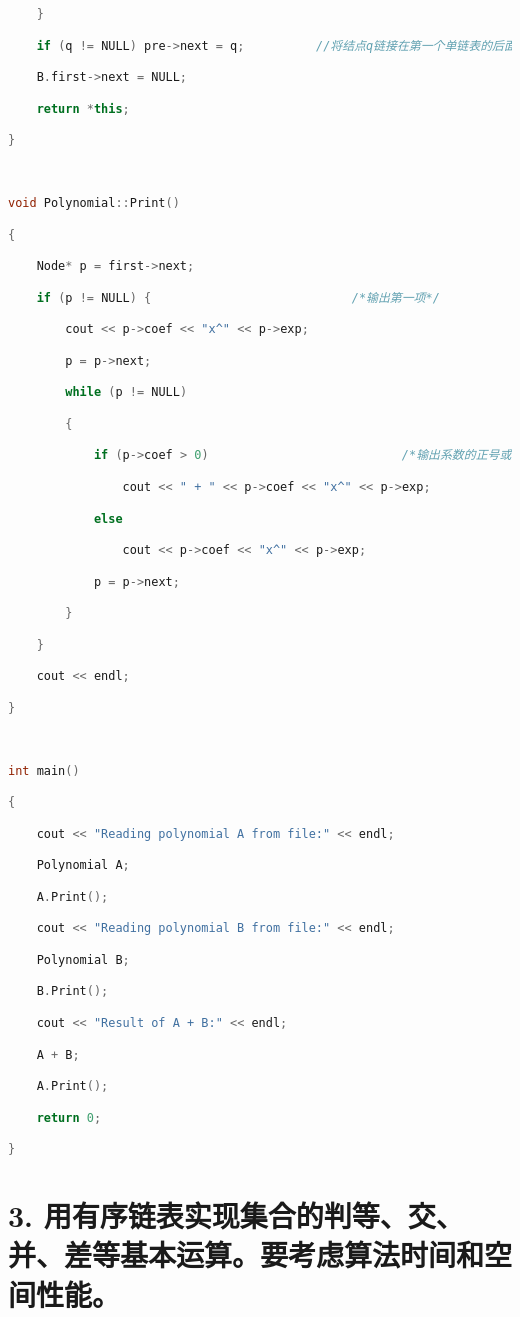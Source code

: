 \begin{lstlisting}[language=C++]
    }

    if (q != NULL) pre->next = q;          //将结点q链接在第一个单链表的后面

    B.first->next = NULL;

    return *this;

}

  

void Polynomial::Print()

{

    Node* p = first->next;

    if (p != NULL) {                            /*输出第一项*/

        cout << p->coef << "x^" << p->exp;

        p = p->next;

        while (p != NULL)

        {

            if (p->coef > 0)                           /*输出系数的正号或负号*/

                cout << " + " << p->coef << "x^" << p->exp;

            else

                cout << p->coef << "x^" << p->exp;

            p = p->next;

        }

    }

    cout << endl;

}

  

int main()

{

    cout << "Reading polynomial A from file:" << endl;

    Polynomial A;

    A.Print();

    cout << "Reading polynomial B from file:" << endl;

    Polynomial B;

    B.Print();

    cout << "Result of A + B:" << endl;

    A + B;

    A.Print();

    return 0;

}
\end{lstlisting}
\section{3. 用有序链表实现集合的判等、交、并、差等基本运算。要考虑算法时间和空间性能。}

